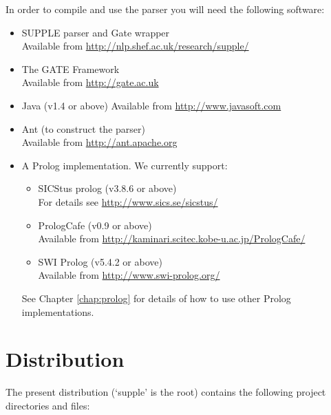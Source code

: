 \documentclass[a4paper,titlepage,openany,twoside]{book}
\begin{document}
In order to compile and use the parser you will need the following 
software:

\begin{itemize}

\item SUPPLE parser and Gate wrapper\\
Available from \url{http://nlp.shef.ac.uk/research/supple/}

\item The GATE Framework\\
Available from \url{http://gate.ac.uk}
 
\item Java (v1.4 or above)
Available from \url{http://www.javasoft.com}

\item Ant (to construct the parser)\\
Available from \url{http://ant.apache.org}

\item A Prolog implementation. We currently support:
\begin{itemize}
\item SICStus prolog (v3.8.6 or above)\\
For details see \url{http://www.sics.se/sicstus/}

\item PrologCafe (v0.9 or above)\\
Available from \url{http://kaminari.scitec.kobe-u.ac.jp/PrologCafe/}

\item SWI Prolog (v5.4.2 or above)\\
Available from \url{http://www.swi-prolog.org/}
\end{itemize}
See Chapter \ref{chap:prolog} for details of how to use other Prolog implementations.

\end{itemize}

\chapter{Distribution}


The present distribution (`supple' is the root)  contains the
following project directories and files:
\end{document}
